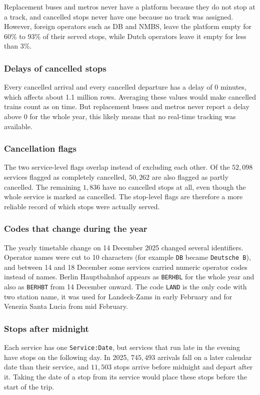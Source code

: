 Replacement buses and metros never have a platform because they do not stop at a track, and cancelled stops never have one because no track was assigned. However, foreign operators such as DB and NMBS, leave the platform empty for 60\% to 93\% of their served stops, while Dutch operators leave it empty for less than 3\%. 

\subsubsection{Delays of cancelled stops}
Every cancelled arrival and every cancelled departure has a delay of 0 minutes, which affects about 1.1 million rows. Averaging these values would make cancelled trains count as on time. But replacement buses and metros never report a delay above 0 for the whole year, this likely means that no real-time tracking was available.

\subsubsection{Cancellation flags}
The two service-level flags overlap instead of excluding each other. Of the $52{,}098$ services flagged as completely cancelled, $50{,}262$ are also flagged as partly cancelled. The remaining $1{,}836$ have no cancelled stops at all, even though the whole service is marked as cancelled. The stop-level flags are therefore a more reliable record of which stops were actually served.

\subsubsection{Codes that change during the year}
The yearly timetable change on 14 December 2025 changed several identifiers. Operator names were cut to 10 characters (for example \texttt{DB} became \texttt{Deutsche B}), and between 14 and 18 December some services carried numeric operator codes instead of names. Berlin Hauptbahnhof appears as \texttt{BERHBL} for the whole year and also as \texttt{BERHBT} from 14 December onward. The code \texttt{LAND} is the only code with two station name, it was used for Landeck-Zams in early February and for Venezia Santa Lucia from mid February.

\subsubsection{Stops after midnight}
Each service has one \texttt{Service:Date}, but services that run late in the evening have stops on the following day. In 2025, $745{,}493$ arrivals fall on a later calendar date than their service, and $11{,}503$ stops arrive before midnight and depart after it. Taking the date of a stop from its service would place these stops before the start of the trip.

